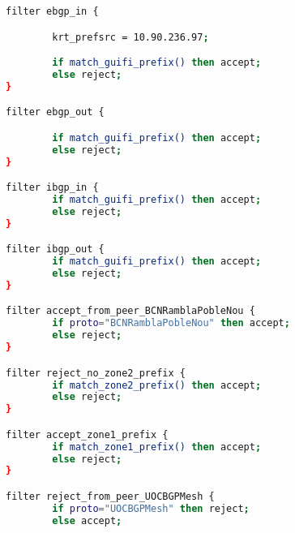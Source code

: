 \begin{lstlisting}[language=bash, caption={Bird Filters}]
filter ebgp_in {

        krt_prefsrc = 10.90.236.97;

        if match_guifi_prefix() then accept;
        else reject;
}

filter ebgp_out {

        if match_guifi_prefix() then accept;
        else reject;
}

filter ibgp_in {
        if match_guifi_prefix() then accept;
        else reject;
}

filter ibgp_out {
        if match_guifi_prefix() then accept;
        else reject;
}

filter accept_from_peer_BCNRamblaPobleNou {
        if proto="BCNRamblaPobleNou" then accept;
        else reject;
}

filter reject_no_zone2_prefix {
        if match_zone2_prefix() then accept;
        else reject;
}

filter accept_zone1_prefix {
        if match_zone1_prefix() then accept;
        else reject;
}

filter reject_from_peer_UOCBGPMesh {
        if proto="UOCBGPMesh" then reject;
        else accept;
\end{lstlisting}